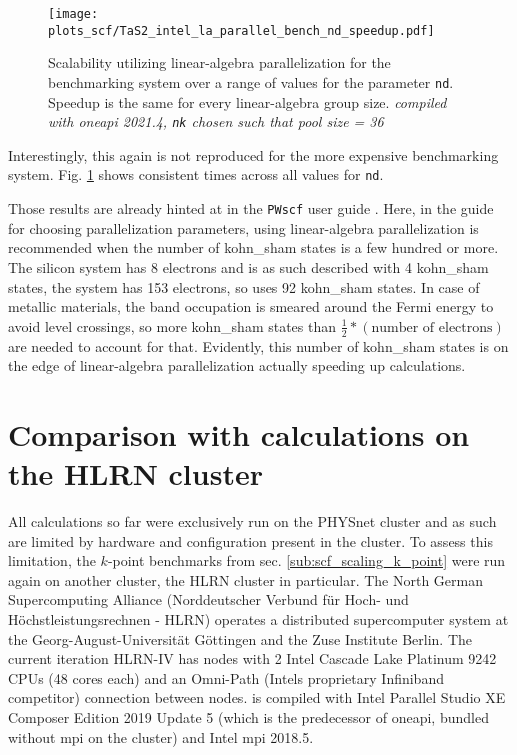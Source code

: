 \documentclass[main.tex]{subfiles}
\begin{document}
\begin{figure}[ht]
    \centering
    \texttt{[image: plots\_scf/TaS2\_intel\_la\_parallel\_bench\_nd\_speedup.pdf]}
    \caption{Scalability utilizing linear-algebra parallelization for the \TaS benchmarking system over a range of values for the parameter \texttt{nd}. Speedup is the same for every linear-algebra group size. \emph{\QE compiled with \gls{oneapi} 2021.4, \texttt{nk} chosen such that pool size = 36}}
    \label{fig:scaling_scf_nd_tas2}
\end{figure}
Interestingly, this again is not reproduced for the more expensive \TaS benchmarking system.
Fig. \ref{fig:scaling_scf_nd_tas2} shows consistent times across all values for \texttt{nd}.

Those results are already hinted at in the \texttt{PWscf} user guide \cite{noauthor_pwscf_nodate}.
Here, in the guide for choosing parallelization parameters, using linear-algebra parallelization is recommended when the number of \acrshort{kohn_sham} states is a few hundred or more.
The silicon system has 8 electrons and is as such described with 4 \gls{kohn_sham} states, the \TaS system has 153 electrons, so \QE uses 92 \gls{kohn_sham} states.
In case of metallic materials, the band occupation is smeared around the Fermi energy to avoid level crossings, so more \gls{kohn_sham} states than \(\frac{1}{2} * (\textrm{number of electrons})\) are needed to account for that.
Evidently, this number of \acrshort{kohn_sham} states is on the edge of linear-algebra parallelization actually speeding up calculations.

\section{Comparison with calculations on the HLRN cluster}

All calculations so far were exclusively run on the PHYSnet cluster and as such are limited by hardware and configuration present in the cluster.
To assess this limitation, the \(k\)-point benchmarks from sec. \ref{sub:scf_scaling_k_point} were run again on another cluster, the HLRN cluster in particular.
The North German Supercomputing Alliance (Norddeutscher Verbund für Hoch- und Höchstleistungsrechnen - HLRN) operates a distributed supercomputer system at the Georg-August-Universität Göttingen and the Zuse Institute Berlin.
The current iteration HLRN-IV has nodes with 2 Intel Cascade Lake Platinum 9242 CPUs (48 cores each) and an Omni-Path (Intels proprietary Infiniband competitor) connection between nodes.
\QE is compiled with Intel Parallel Studio XE Composer Edition 2019 Update 5 (which is the predecessor of \gls{oneapi}, bundled without \gls{mpi} on the cluster) and Intel \gls{mpi} 2018.5.
\end{document}
